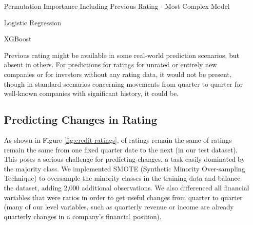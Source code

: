 \documentclass{article}[11pt]
\begin{document}
    \begin{table}[h!]
        \centering
        \caption{Permutation Importance Including Previous Rating - Most Complex Model}
        \begin{minipage}[c]{0.495\linewidth}
            \centering
            
            \caption*{\footnotesize Logistic Regression} 
        \end{minipage}
        \begin{minipage}[c]{0.495\linewidth}
            \centering
            
            \caption*{\footnotesize XGBoost} 
        \end{minipage}
        \label{tab:include-previous-permutation-importance}
    \end{table}

    Previous rating might be available in some real-world prediction scenarios, but absent in others. For predictions for ratings for unrated or entirely new companies or for investors without any rating data, it would not be present, though in standard scenarios concerning movements from quarter to quarter for well-known companies with significant history, it could be.

    \clearpage
    \newpage

    \subsection{Predicting Changes in Rating}

    \label{sec:change-prediction}

    As shown in Figure \ref{fig:credit-ratings}, \shareNotChanges \space of ratings remain the same of ratings remain the same from one fixed quarter date to the next (\shareNotChangesTest \space in our test dataset). This poses a serious challenge for predicting changes, a task easily dominated by the majority class. We implemented SMOTE (Synthetic Minority Over-sampling Technique) \citep{chawla_smote_2002} to oversample the minority classes in the training data and balance the dataset, adding 2,000 additional observations. We also differenced all financial variables that were ratios in order to get useful changes from quarter to quarter (many of our level variables, such as quarterly revenue or income are already quarterly changes in a company's financial position).
\end{document}
